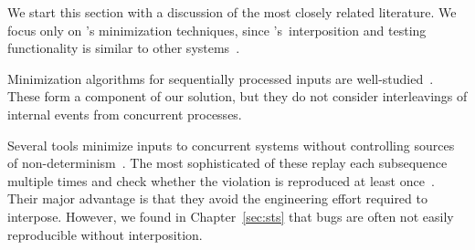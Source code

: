 
%

We start this section with a discussion of the most closely
related literature. We focus only on \sys's minimization techniques, since
\sys's~interposition and testing functionality is similar to other
systems~\cite{lin2009modist,simsa2010dbug,leesatapornwongsa2014samc}.

 Minimization
algorithms for sequentially processed inputs are
well-studied~\cite{Zeller:2002:SIF:506201.506206,claessen2000quickcheck,regehr2012test,whitaker2004configuration,burger2011minimizing,fse_web_ddmin,chang2007simulation}.
These form a component of our solution, but they do not consider
interleavings of internal events from concurrent processes.

 Several
tools minimize inputs to concurrent
systems without controlling sources of non-determinism~\cite{arts2006testing,clause2007technique,tucek2007triage,jin2013f3,hughes2011testing}.
The most sophisticated of these replay each subsequence
multiple times and check whether the violation is reproduced at least once~\cite{hughes2011testing,claessen2009finding}.
Their major advantage is that they avoid the engineering effort required to
interpose. However, we found in Chapter~\ref{sec:sts}
 that bugs are often not easily reproducible without
interposition.

